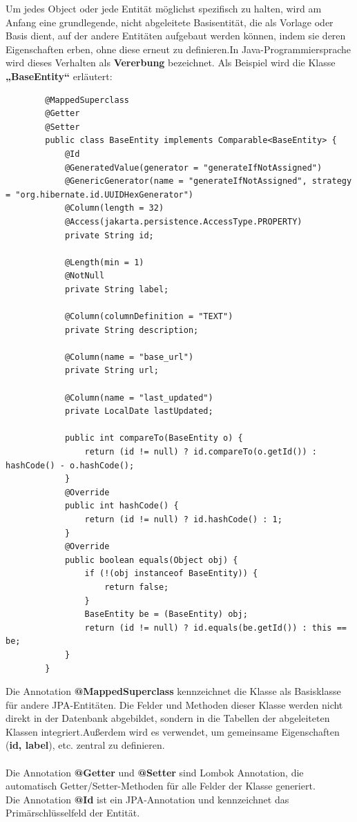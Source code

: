\documentclass[a4paper,12pt]{scrreprt}
\begin{document}
	Um jedes Object oder jede Entität möglichst spezifisch zu halten, wird am Anfang eine grundlegende, nicht abgeleitete Basisentität, die als Vorlage oder Basis dient, auf der andere Entitäten aufgebaut werden können, indem sie deren Eigenschaften erben, ohne diese erneut zu definieren.In Java-Programmiersprache wird dieses Verhalten als \textbf{Vererbung} bezeichnet. Als Beispiel wird die Klasse \textbf{„BaseEntity“}  erläutert:
	\begin{lstlisting}
		@MappedSuperclass
		@Getter
		@Setter
		public class BaseEntity implements Comparable<BaseEntity> {
			@Id
			@GeneratedValue(generator = "generateIfNotAssigned")
			@GenericGenerator(name = "generateIfNotAssigned", strategy = "org.hibernate.id.UUIDHexGenerator")
			@Column(length = 32)
			@Access(jakarta.persistence.AccessType.PROPERTY)
			private String id;
			
			@Length(min = 1)
			@NotNull
			private String label;
			
			@Column(columnDefinition = "TEXT")
			private String description;
			
			@Column(name = "base_url")
			private String url;
			
			@Column(name = "last_updated")
			private LocalDate lastUpdated;
			
			public int compareTo(BaseEntity o) {
				return (id != null) ? id.compareTo(o.getId()) : hashCode() - o.hashCode();
			}
			@Override
			public int hashCode() {
				return (id != null) ? id.hashCode() : 1;
			}
			@Override
			public boolean equals(Object obj) {
				if (!(obj instanceof BaseEntity)) {
					return false;
				}
				BaseEntity be = (BaseEntity) obj;
				return (id != null) ? id.equals(be.getId()) : this == be;
			}
		}	
	\end{lstlisting}
	Die Annotation \textbf{@MappedSuperclass} kennzeichnet die Klasse als Basisklasse für andere JPA-Entitäten. Die Felder und Methoden dieser Klasse werden nicht direkt in der Datenbank abgebildet, sondern in die Tabellen der abgeleiteten Klassen integriert.Außerdem wird es verwendet, um gemeinsame Eigenschaften (\textbf{id, label}), etc. zentral zu definieren.\\ \\
	Die Annotation \textbf{@Getter} und \textbf{@Setter} sind Lombok Annotation, die automatisch Getter/Setter-Methoden für alle Felder der Klasse generiert.\\
	Die Annotation \textbf{@Id} ist ein JPA-Annotation und kennzeichnet das Primärschlüsselfeld der Entität.\\ \\
\end{document}
